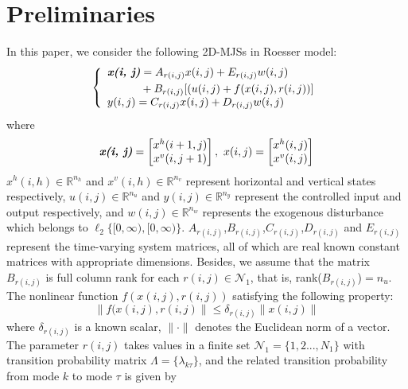 \documentclass[conference]{IEEEtran}
\begin{document}
\section{Preliminaries} \label{priliminaries}
	In this paper, we consider the following 2D-MJSs in Roesser model:
	\begin{equation} \label{system-equation}
	\left\{
		\begin{array}{lr}
			\begin{split}
				\emph{\textbf{x(i, j)}} &= A_{r(i,j)}x(i,j)+E_{r(i,j)}w(i,j)\\
										&+B_{r(i,j)}[(u(i,j)+f(x(i,j),r(i,j))]
			\end{split}\\
			\begin{split}
				y(i,j) = C_{r(i,j)}x(i,j)+D_{r(i,j)}w(i,j)
			\end{split}
		\end{array}
	\right.
	\end{equation}
	where
	\begin{equation*}
		\emph{\textbf{x(i, j)}} = \begin{bmatrix}
			x^{h}(i+1,j)\\
			x^{v}(i,j+1)
		\end{bmatrix}, \ 
		x(i, j) = \begin{bmatrix}
		x^{h}(i,j)\\
		x^{v}(i,j)
		\end{bmatrix}          
	\end{equation*}
	$x^{h}(i,h)\in \mathbb{R}^{n_h}$ and $x^{v}(i,h)\in \mathbb{R}^{n_v}$ represent horizontal and vertical states respectively, $u(i,j) \in \mathbb{R}^{n_u}$ and $y(i,j) \in \mathbb{R}^{n_y}$ represent the controlled input and output respectively, and $w(i,j) \in \mathbb{R}^{n_w}$ represents the exogenous disturbance which belongs to $\ell_{2}\{[0,\infty),[0,\infty)\}$. $A_{r(i,j)}$,$B_{r(i,j)}$,$C_{r(i,j)}$,$D_{r(i,j)}$ and $E_{r(i,j)}$ represent the time-varying system matrices, all of which are real known constant matrices with appropriate dimensions. Besides, we assume that the matrix $B_{r(i,j)}$ is full column rank for each $r(i,j)\in\mathcal{N}_{1}$, that is, rank($B_{r(i,j)}$)$=n_u$. The nonlinear function $f(x(i,j),r(i,j))$ satisfying the following property:
	\begin{equation}\label{nonlinear-func}
		\|f(x(i,j),r(i,j)\| \leq \delta_{r(i,j)}\|x(i,j)\|
	\end{equation}
	where $\delta_{r(i,j)}$ is a known scalar, $\|\cdot\|$ denotes the Euclidean norm of a vector. The parameter $r(i,j)$ takes values in a finite set $\mathcal{N}_{1}=\{1,2...,N_{1} \}$ with transition probability matrix $\varLambda = \{\lambda_{k\tau}\}$, and the related transition probability from mode $k$ to mode $\tau$ is given by 
\end{document}
